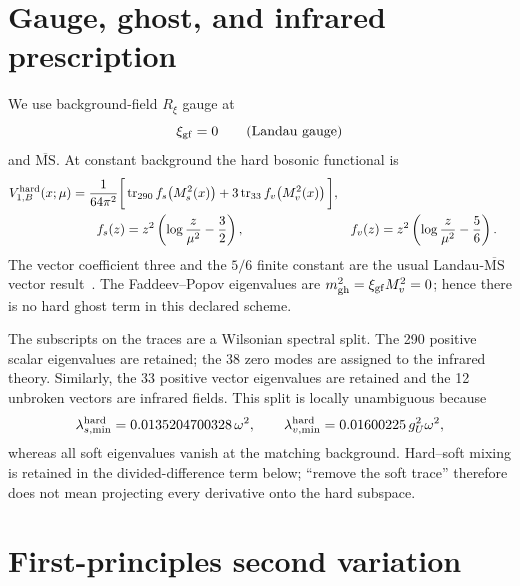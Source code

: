 \documentclass[11pt]{article}
\newcommand{\tr}{\operatorname{tr}}
\newcommand{\MSbar}{\overline{\mathrm{MS}}}
\begin{document}
\section{Gauge, ghost, and infrared prescription}

We use background-field \(R_\xi\) gauge at
\begin{equation}
 \xi_{\rm gf}=0
 \qquad\text{(Landau gauge)}
 \label{eq:landau}
\end{equation}
and \(\MSbar\).  At constant background the hard bosonic functional is
\begin{align}
 V_{1,B}^{\rm hard}(x;\mu)
 =\frac{1}{64\pi^2}\bigg[&
 \tr_{290} f_s\!\left(M_s^2(x)\right)
 +3\tr_{33} f_v\!\left(M_v^2(x)\right)\bigg],
 \label{eq:cw}\\
 f_s(z)&=z^2\left(\log\frac{z}{\mu^2}-\frac32\right),
 &f_v(z)&=z^2\left(\log\frac{z}{\mu^2}-\frac56\right).
 \label{eq:fdefs}
\end{align}
The vector coefficient three and the \(5/6\) finite constant are the usual
Landau-\(\MSbar\) vector result~\cite{ColemanWeinberg1973,Martin2001}.  The
Faddeev--Popov eigenvalues are
\(m_{\rm gh}^2=\xi_{\rm gf}M_v^2=0\); hence there is no hard ghost term in
this declared scheme.

The subscripts on the traces are a Wilsonian spectral split.  The 290
positive scalar eigenvalues are retained; the 38 zero modes are assigned to
the infrared theory.  Similarly, the 33 positive vector eigenvalues are
retained and the 12 unbroken vectors are infrared fields.  This split is
locally unambiguous because
\begin{equation}
 \lambda_{s,\min}^{\rm hard}=0.0135204700328\,\omega^2,
 \qquad
 \lambda_{v,\min}^{\rm hard}=0.01600225\,g_U^2\omega^2,
 \label{eq:hardgaps}
\end{equation}
whereas all soft eigenvalues vanish at the matching background.  Hard--soft
mixing is retained in the divided-difference term below; ``remove the soft
trace'' therefore does not mean projecting every derivative onto the hard
subspace.

\section{First-principles second variation}
\end{document}
